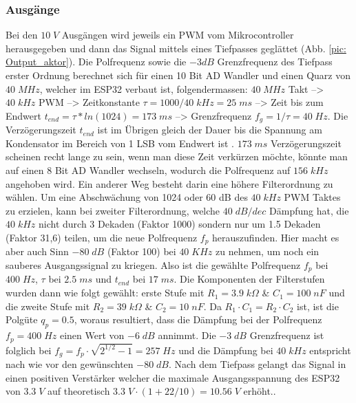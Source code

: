 \subsubsection{Ausgänge}
Bei den $10\;V$ Ausgängen wird jeweils ein PWM vom Mikrocontroller herausgegeben und dann das Signal mittels eines Tiefpasses geglättet (Abb. \ref{pic: Output_aktor}). Die Polfrequenz sowie die $-3dB$ Grenzfrequenz des Tiefpass erster Ordnung berechnet sich für einen 10 Bit AD Wandler und einen Quarz von $40\;MHz$, welcher im ESP32 verbaut ist, folgendermassen: $40\;MHz$ Takt --> $40\;kHz$ PWM --> Zeitkonstante $\tau = 1000/40\;kHz = 25\;ms $ --> Zeit bis zum Endwert $ t_{end}=\tau * ln(1024) = 173\;ms$ --> Grenzfrequenz $f_g = 1/\tau = 40\;Hz$. Die Verzögerungszeit $t_{end}$ ist im Übrigen gleich der Dauer bis die Spannung am Kondensator im Bereich von 1 LSB vom Endwert ist \cite{ronald_locher_2017}. $173\;ms$ Verzögerungszeit scheinen recht lange zu sein, wenn man diese Zeit verkürzen möchte, könnte man auf einen 8 Bit AD Wandler wechseln, wodurch die Polfrequenz auf $156\;kHz$ angehoben wird. Ein anderer Weg besteht darin eine höhere Filterordnung zu wählen. Um eine Abschwächung von 1024 oder 60 dB des $40\;kHz$ PWM Taktes zu erzielen, kann bei zweiter Filterordnung, welche $40\;dB/dec$ Dämpfung hat, die $40\;kHz$ nicht durch 3 Dekaden (Faktor 1000) sondern nur um 1.5 Dekaden (Faktor 31,6) teilen, um die neue Polfrequenz $f_p$ herauszufinden. Hier macht es aber auch Sinn $-80\;dB$ (Faktor 100) bei $40\;KHz$ zu nehmen, um noch ein sauberes Ausgangssignal zu kriegen. Also ist die gewählte Polfrequenz $f_p$ bei $400\;Hz$, $\tau$ bei $2.5\;ms$ und $ t_{end}$ bei $17\;ms$. Die Komponenten der Filterstufen wurden dann wie folgt gewählt: erste Stufe mit $R_1 = 3.9\;k \Omega $ \& $C_1 = 100\;nF$ und die zweite Stufe mit $R_2 = 39\;k \Omega $ \& $C_2 = 10\;nF$. Da $R_1 \cdot C_1 = R_2 \cdot C_2$ ist, ist die Polgüte $q_p = 0.5$, woraus resultiert, dass die Dämpfung bei der Polfrequenz $f_p = 400\;Hz$ einen Wert von $-6\;dB$ annimmt. Die $-3\;dB$ Grenzfrequenz ist folglich bei $f_g = f_p \cdot \sqrt{2^{1/2}-1} = 257\;Hz$ \cite{miller_rc-glied_nodate} und die Dämpfung bei $40\;kHz$ entspricht nach wie vor den gewünschten $-80\;dB$. Nach dem Tiefpass gelangt das Signal in einen positiven Verstärker welcher die maximale Ausgangsspannung des ESP32 von $3.3\;V$ auf theoretisch $ 3.3\;V \cdot (1+ 22/10) = 10.56\;V$ erhöht..

